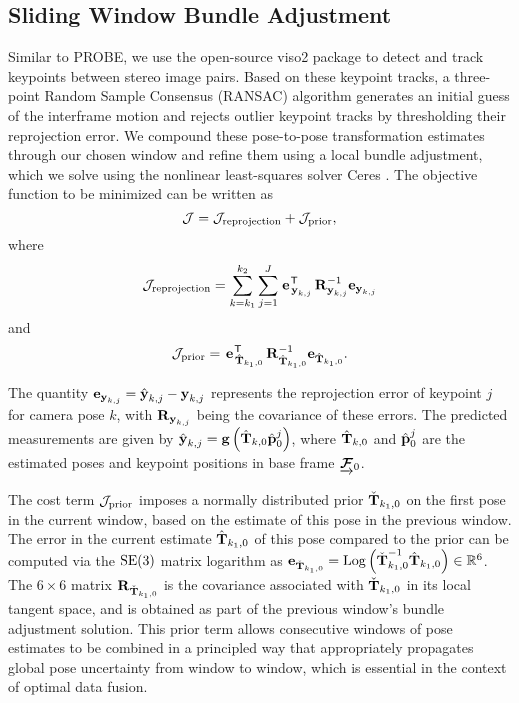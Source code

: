 \subsection{Sliding Window Bundle Adjustment}
Similar to PROBE, we use the open-source \textsf{viso2} package \citep{Geiger2011-xe} to detect and track keypoints between stereo image pairs.
Based on these keypoint tracks, a three-point Random Sample Consensus (RANSAC) algorithm \citep{fischler1981random} generates an initial guess of the interframe motion and rejects outlier keypoint tracks by thresholding their reprojection error.
We compound these pose-to-pose transformation estimates through our chosen window and refine them using a local bundle adjustment, which we solve using the nonlinear least-squares solver Ceres \citep{ceres-solver}.
The objective function to be minimized can be written as
\begin{equation} \label{eq:cost_function}
    \mathcal{J} = \mathcal{J}_\text{reprojection} + \mathcal{J}_\text{prior},
\end{equation}
where
\begin{equation} \label{eq:reprojection_cost}
	\mathcal{J}_\text{reprojection} = \sum_{k=k_1}^{k_2} \sum_{j=1}^J \left.{\boldsymbol{\mathbf{e}}}\right.^{\mkern-1.0mu\mathsf{T}}_{\boldsymbol{\mathbf{y}}_{k,j}} \boldsymbol{\mathbf{R}}^{-1}_{\boldsymbol{\mathbf{y}}_{k,j}} \boldsymbol{\mathbf{e}}_{\boldsymbol{\mathbf{y}}_{k,j}}
\end{equation}
and 
\begin{equation} \label{eq:prior_cost}
	\mathcal{J}_\text{prior} = \left.{\boldsymbol{\mathbf{e}}}\right.^{\mkern-1.0mu\mathsf{T}}_{\hat{\boldsymbol{\mathbf{T}}}_{k_1,0}} \boldsymbol{\mathbf{R}}^{-1}_{\hat{\boldsymbol{\mathbf{T}}}_{k_1,0}} \boldsymbol{\mathbf{e}}_{\hat{\boldsymbol{\mathbf{T}}}_{k_1,0}}.
\end{equation}

The quantity $\boldsymbol{\mathbf{e}}_{\boldsymbol{\mathbf{y}}_{k,j}} = \hat{\boldsymbol{\mathbf{y}}}_{k,j} - \boldsymbol{\mathbf{y}}_{k,j}$ represents the reprojection error of keypoint $j$ for camera pose $k$, with $\boldsymbol{\mathbf{R}}_{\boldsymbol{\mathbf{y}}_{k,j}}$ being the covariance of these errors.
The predicted measurements are given by $\hat{\boldsymbol{\mathbf{y}}}_{k,j} = \boldsymbol{\mathbf{g}}\left(\hat{\boldsymbol{\mathbf{T}}}_{k,0} \hat{\boldsymbol{\mathbf{p}}}^j_{0}\right)$, where $\hat{\boldsymbol{\mathbf{T}}}_{k,0}$ and $\hat{\boldsymbol{\mathbf{p}}}^j_{0}$ are the estimated poses and keypoint positions in base frame $\underrightarrow{ \boldsymbol{\mathbf{\mathcal{F}}} }_{0}$.

The cost term $\mathcal{J}_\text{prior}$ imposes a normally distributed prior $\check{\boldsymbol{\mathbf{T}}}_{k_1,0}$ on the first pose in the current window, based on the estimate of this pose in the previous window.
The error in the current estimate $\hat{\boldsymbol{\mathbf{T}}}_{k_1,0}$ of this pose compared to the prior can be computed via the $\mathrm{SE}(3)$ matrix logarithm as $\boldsymbol{\mathbf{e}}_{\check{\boldsymbol{\mathbf{T}}}_{k_1,0}} = \mathrm{Log}\left({\check{\boldsymbol{\mathbf{T}}}_{k_1,0}^{-1} \hat{\boldsymbol{\mathbf{T}}}_{k_1,0}}\right) \in \mathbb{R}^6$.
The $6 \times 6$ matrix $\boldsymbol{\mathbf{R}}_{\check{\boldsymbol{\mathbf{T}}}_{k_1,0}}$ is the covariance associated with $\check{\boldsymbol{\mathbf{T}}}_{k_1,0}$ in its local tangent space, and is obtained as part of the previous window's bundle adjustment solution.
This prior term allows consecutive windows of pose estimates to be combined in a principled way that appropriately propagates global pose uncertainty from window to window, which is essential in the context of optimal data fusion.

